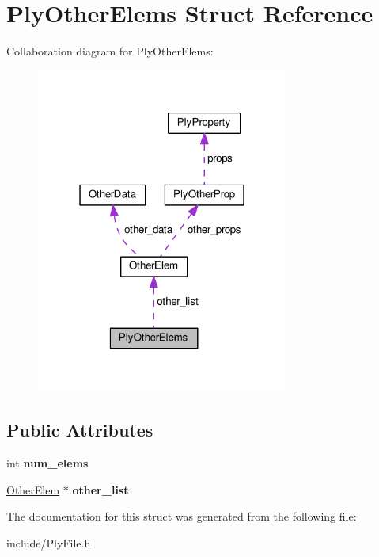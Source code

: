 \hypertarget{structPlyOtherElems}{\section{Ply\-Other\-Elems Struct Reference}
\label{structPlyOtherElems}
}


Collaboration diagram for Ply\-Other\-Elems\-:\nopagebreak
\begin{figure}[H]
\begin{center}
\leavevmode
\includegraphics[width=235pt]{structPlyOtherElems__coll__graph}
\end{center}
\end{figure}
\subsection*{Public Attributes}
\begin{DoxyCompactItemize}
\item 
\hypertarget{structPlyOtherElems_ab464cc630ef0f33b64474ddf9dd00d63}{int {\bfseries num\-\_\-elems}}\label{structPlyOtherElems_ab464cc630ef0f33b64474ddf9dd00d63}

\item 
\hypertarget{structPlyOtherElems_a2a3390c0b6de21756b10ae550c66de8a}{\hyperlink{structOtherElem}{Other\-Elem} $\ast$ {\bfseries other\-\_\-list}}\label{structPlyOtherElems_a2a3390c0b6de21756b10ae550c66de8a}

\end{DoxyCompactItemize}


The documentation for this struct was generated from the following file\-:\begin{DoxyCompactItemize}
\item 
include/Ply\-File.\-h\end{DoxyCompactItemize}
